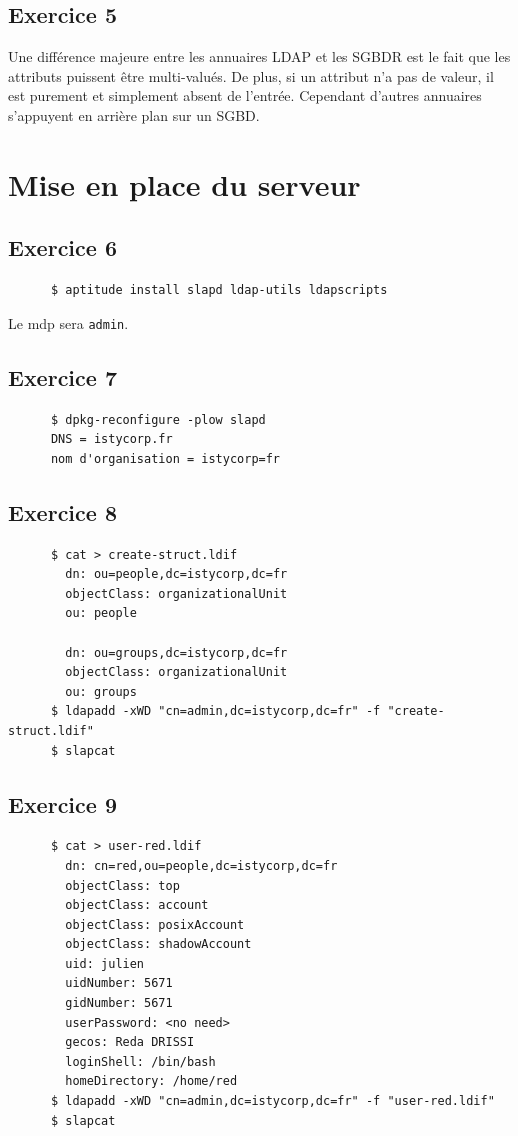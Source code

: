 \documentclass{report}
\begin{document}
\subsection{Exercice 5}
Une différence majeure entre les annuaires LDAP et les SGBDR est le fait que les attributs puissent être multi-valués.
De plus, si un attribut n'a pas de valeur, il est purement et simplement absent de l'entrée. Cependant d'autres
annuaires s'appuyent en arrière plan sur un SGBD.
\section{Mise en place du serveur}
\subsection{Exercice 6}
\begin{tcolorbox}
  \begin{verbatim}
      $ aptitude install slapd ldap-utils ldapscripts
  \end{verbatim}
\end{tcolorbox}
Le mdp sera \texttt{admin}.
\subsection{Exercice 7}
\begin{tcolorbox}
  \begin{verbatim}
      $ dpkg-reconfigure -plow slapd
      DNS = istycorp.fr
      nom d'organisation = istycorp=fr
  \end{verbatim}
\end{tcolorbox}
\subsection{Exercice 8}
\begin{tcolorbox}
  \begin{verbatim}
      $ cat > create-struct.ldif
        dn: ou=people,dc=istycorp,dc=fr
        objectClass: organizationalUnit
        ou: people

        dn: ou=groups,dc=istycorp,dc=fr
        objectClass: organizationalUnit
        ou: groups
      $ ldapadd -xWD "cn=admin,dc=istycorp,dc=fr" -f "create-struct.ldif"
      $ slapcat
  \end{verbatim}
\end{tcolorbox}
\subsection{Exercice 9}
\begin{tcolorbox}
  \begin{verbatim}
      $ cat > user-red.ldif
        dn: cn=red,ou=people,dc=istycorp,dc=fr
        objectClass: top
        objectClass: account
        objectClass: posixAccount
        objectClass: shadowAccount
        uid: julien
        uidNumber: 5671
        gidNumber: 5671
        userPassword: <no need>
        gecos: Reda DRISSI
        loginShell: /bin/bash
        homeDirectory: /home/red
      $ ldapadd -xWD "cn=admin,dc=istycorp,dc=fr" -f "user-red.ldif"
      $ slapcat
  \end{verbatim}
\end{tcolorbox}
\end{document}
